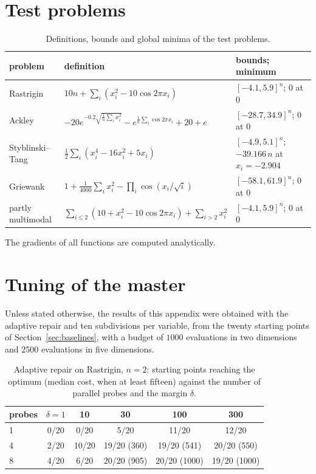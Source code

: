 \documentclass[pdflatex,sn-basic]{sn-jnl}
\newenvironment{appendices}{\appendix}{}
\begin{document}
\begin{appendices}

\section{Test problems}\label{app:problems}

\begin{table}[h]
  \centering
  \caption{Definitions, bounds and global minima of the test problems.}
  \label{tab:problems}
  \footnotesize\setlength{\tabcolsep}{4pt}
  \begin{tabular}{lll}
    \toprule
    problem & definition & bounds; minimum \\
    \midrule
    Rastrigin & $10n + \sum_i (x_i^2 - 10\cos 2\pi x_i)$ & $[-4.1, 5.9]^n$; $0$ at $0$ \\
    Ackley & $-20 e^{-0.2\sqrt{\frac1n\sum_i x_i^2}} - e^{\frac1n\sum_i\cos 2\pi x_i} + 20 + e$ & $[-28.7, 34.9]^n$; $0$ at $0$ \\
    Styblinski--Tang & $\frac12\sum_i (x_i^4 - 16x_i^2 + 5x_i)$ & $[-4.9, 5.1]^n$; $-39.166\,n$ at $x_i = -2.904$ \\
    Griewank & $1 + \frac{1}{4000}\sum_i x_i^2 - \prod_i \cos(x_i/\sqrt{i})$ & $[-58.1, 61.9]^n$; $0$ at $0$ \\
    partly multimodal & $\sum_{i\le 2}(10 + x_i^2 - 10\cos 2\pi x_i) + \sum_{i>2} x_i^2$ & $[-4.1, 5.9]^n$; $0$ at $0$ \\
    \bottomrule
  \end{tabular}
\end{table}

The gradients of all functions are computed analytically.

\section{Tuning of the master}\label{app:tuning}

Unless stated otherwise, the results of this appendix were obtained with the
adaptive repair and ten subdivisions per variable, from the twenty starting
points of Section~\ref{sec:baselines}, with a budget of $1000$ evaluations in two
dimensions and $2500$ evaluations in five dimensions.

\begin{table}[h]
  \centering
  \caption{Adaptive repair on Rastrigin, $n=2$: starting points reaching the
    optimum (median cost, when at least fifteen) against the number of parallel probes and the margin
    $\delta$.}
  \label{tab:margin}
  \small
  \begin{tabular}{lccccc}
    \toprule
    probes & $\delta = 1$ & 10 & 30 & 100 & 300 \\
    \midrule
    1 & 0/20 & 0/20  & 5/20        & 11/20        & 12/20 \\
    4 & 2/20 & 10/20 & 19/20 (360) & 19/20 (541)  & 20/20 (550) \\
    8 & 4/20 & 6/20  & 20/20 (905) & 20/20 (1000) & 19/20 (1000) \\
    \bottomrule
  \end{tabular}
\end{table}


\end{appendices}
\end{document}
